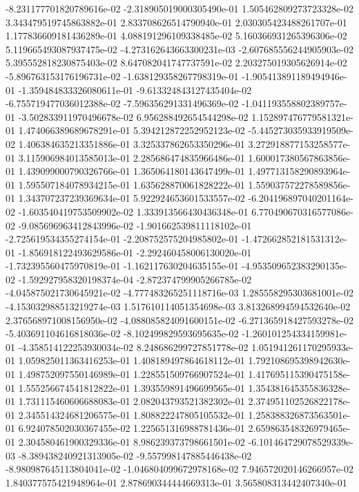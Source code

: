 -8.231177701820789616e-02
-2.318905019000305490e-01
1.505462809273723328e-02
3.343479519745863882e-01
2.833708626514790940e-01
2.030305423488261707e-01
1.177836609181436289e-01
4.088191296109338485e-02
5.160366931265396306e-02
5.119665493087937475e-02
-4.273162643663300231e-03
-2.607685556244905903e-02
5.395552818230875403e-02
8.647082041747737591e-02
2.203275019305626914e-02
-5.896763153176196731e-02
-1.638129358267798319e-01
-1.905413891189494946e-01
-1.359484833326080611e-01
-9.613324843127435404e-02
-6.755719477036012388e-02
-7.596356291331496369e-02
-1.041193558802389757e-01
-3.502833911970496678e-02
6.956288492654544298e-02
1.152897476779581321e-01
1.474066389689678291e-01
5.394212872252952123e-02
-5.445273035933919509e-02
1.406384635213351886e-01
3.325337862653350296e-01
3.272918877153258577e-01
3.115906984013585013e-01
2.285686474835966486e-01
1.600017380567863856e-01
1.439099000790326766e-01
1.365064180143647499e-01
1.497713158290893964e-01
1.595507184078934215e-01
1.635628870061828222e-01
1.559037572278589856e-01
1.343707237239369634e-01
5.922924653601533557e-02
-6.204196897040201164e-02
-1.603540419753509902e-02
1.333913566430436348e-01
6.770490670316577086e-02
-9.085696963412843996e-02
-1.901662539811118102e-01
-2.725619534355274154e-01
-2.208752575204985802e-01
-1.472662852181531312e-01
-1.856918122493629586e-01
-2.292460458006130020e-01
-1.732395560475970819e-01
-1.162117630204635155e-01
-4.953509652383290135e-02
-1.592927958320198374e-04
-2.872374799905266785e-02
-4.045875021730645921e-02
-4.777483265251118716e-03
1.285558295303681001e-02
-4.153032988513219274e-03
1.517610114051354698e-03
3.813268994594532640e-02
2.376568971008156950e-02
-4.088085824091600151e-02
-6.271365918427593278e-02
-5.403691104616818036e-02
-8.102499829593695635e-02
-1.260101254334159981e-01
-4.358514122253930034e-02
8.248686299727851778e-02
1.051941261170295933e-01
1.059825011363416253e-01
1.408189497864618112e-01
1.792108695398942630e-01
1.498752097550146989e-01
1.228551509766907524e-01
1.417695115390475158e-01
1.555256674541812822e-01
1.393559891496699565e-01
1.354381645355836328e-01
1.731115460606688083e-01
2.082043793521382302e-01
2.374951102526822178e-01
2.345514324681206575e-01
1.808822247805105532e-01
1.258388326873563501e-01
6.924078502030367455e-02
1.225651316988781436e-01
2.659863548326979465e-01
2.304580461900329336e-01
8.986239373798661501e-02
-6.101464729078529339e-03
-8.389438240921313905e-02
-9.557998147885446438e-02
-8.980987645113804041e-02
-1.046804099672978168e-02
7.946572020146266957e-02
1.840377575421948964e-01
2.878690344444669313e-01
3.565808313442407340e-01
